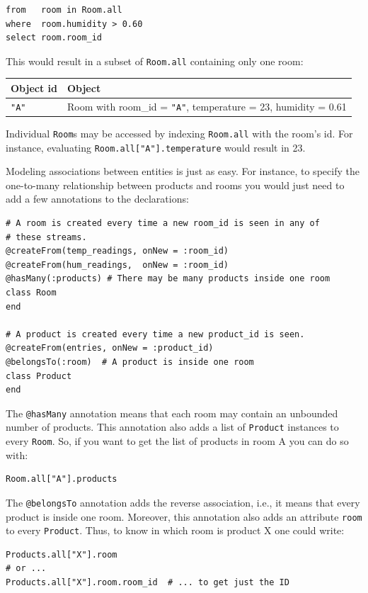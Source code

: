 \documentclass{report}
\begin{document}
\begin{verbatim}
from   room in Room.all
where  room.humidity > 0.60
select room.room_id
\end{verbatim}

This would result in a subset of \verb=Room.all= containing only one
room:

\begin{tabular}{ |l|l| }
  \hline
  Object id & Object \\
  \hline
  \verb="A"= & Room with room\_id = \verb="A"=, temperature = 23, humidity = 0.61 \\
  \hline
\end{tabular}

Individual \verb=Room=s may be accessed by indexing \verb=Room.all=
with the room's id. For instance, evaluating
\verb=Room.all["A"].temperature= would result in 23.

Modeling associations between entities is just as easy. For instance,
to specify the one-to-many relationship between products and rooms you
would just need to add a few annotations to the declarations:

\begin{verbatim}
# A room is created every time a new room_id is seen in any of
# these streams.
@createFrom(temp_readings, onNew = :room_id)
@createFrom(hum_readings,  onNew = :room_id)
@hasMany(:products) # There may be many products inside one room
class Room
end

# A product is created every time a new product_id is seen.
@createFrom(entries, onNew = :product_id)
@belongsTo(:room)  # A product is inside one room
class Product
end
\end{verbatim}

The \verb=@hasMany= annotation means that each room may contain an
unbounded number of products. This annotation also adds a list of
\verb=Product= instances to every \verb=Room=. So, if you want to get
the list of products in room A you can do so with:

\begin{verbatim}
Room.all["A"].products
\end{verbatim}

The \verb=@belongsTo= annotation adds the reverse association, i.e.,
it means that every product is inside one room. Moreover, this
annotation also adds an attribute \verb=room= to every
\verb=Product=. Thus, to know in which room is product X one could
write:

\begin{verbatim}
Products.all["X"].room
# or ...
Products.all["X"].room.room_id  # ... to get just the ID
\end{verbatim}
\end{document}
